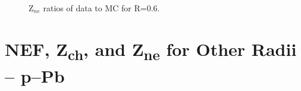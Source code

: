 \documentclass[ALICE]{ALICE_analysis_notes}
\begin{document}
\begin{appendix}
\begin{figure}[h!]
    \qquad
    \caption{Z$_{ne}$ ratios of data to MC for R=0.6.}
    \label{fig:TriggerBiasRatiosZneR06}
\end{figure}

\section{NEF, \texorpdfstring{Z\textsubscript{ch}}{Zch}, and \texorpdfstring{Z\textsubscript{ne}}{Zne} for Other Radii -- p--Pb}
\label{sec:appendixTriggerBiaspPb}




\end{appendix}
\end{document}
